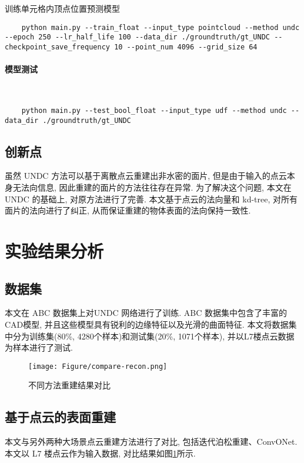 训练单元格内顶点位置预测模型

\lstset{language=bash}
\begin{lstlisting}
    python main.py --train_float --input_type pointcloud --method undc --epoch 250 --lr_half_life 100 --data_dir ./groundtruth/gt_UNDC --checkpoint_save_frequency 10 --point_num 4096 --grid_size 64
\end{lstlisting}

\paragraph{模型测试}~{}

\lstset{language=bash}
\begin{lstlisting}
    python main.py --test_bool_float --input_type udf --method undc --data_dir ./groundtruth/gt_UNDC
\end{lstlisting}

\subsection{创新点}

虽然 UNDC 方法可以基于离散点云重建出非水密的面片, 但是由于输入的点云本身无法向信息, 因此重建的面片的方法往往存在异常. 
为了解决这个问题, 本文在 UNDC 的基础上, 对原方法进行了完善. 本文基于点云的法向量和 kd-tree, 对所有面片的法向进行了纠正, 从而保证重建的物体表面的法向保持一致性. 

\section{实验结果分析}

\subsection{数据集}

本文在 ABC 数据集上对UNDC 网络进行了训练. ABC 数据集中包含了丰富的CAD模型, 并且这些模型具有锐利的边缘特征以及光滑的曲面特征. 
本文将数据集中分为训练集(80\%, 4280个样本)和测试集(20\%, 1071个样本), 并以L7楼点云数据为样本进行了测试. 

\begin{figure}[H]
	\center
	\texttt{[image: Figure/compare-recon.png]}
	\centering
	\caption{不同方法重建结果对比}\label{fig:fig-compare}
\end{figure}

\subsection{基于点云的表面重建}
本文与另外两种大场景点云重建方法进行了对比, 包括迭代泊松重建\cite{hou2022iterative}、ConvONet\cite{tang2021sa}. 本文以 L7 楼点云作为输入数据, 对比结果如图\ref{fig:fig-compare}所示. 


